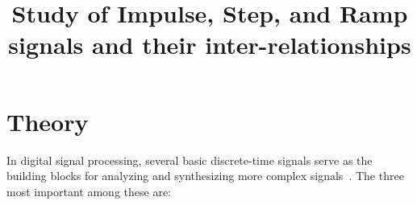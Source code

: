 \documentclass[12pt]{article}
\title{Study of Impulse, Step, and Ramp signals and their inter-relationships}
\author{}
\date{}
\begin{document}


\pagebreak

\tableofcontents

\pagebreak
{}
\maketitle

\section*{Theory}
In digital signal processing, several basic discrete-time signals serve as the building blocks for analyzing and synthesizing more complex signals~\cite{oppenheim_dsp}. The three most important among these are:
\end{document}
